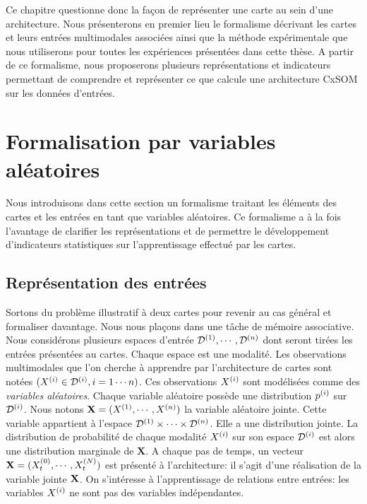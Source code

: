 Ce chapitre questionne donc la façon de représenter une carte au sein d'une architecture. Nous présenterons en premier lieu le formalisme décrivant les cartes et leurs entrées multimodales associées ainsi que la méthode expérimentale que nous utiliserons pour toutes les expériences présentées dans cette thèse. A partir de ce formalisme, nous proposerons plusieurs représentations et indicateurs permettant de comprendre et représenter ce que calcule une architecture CxSOM sur les données d'entrées.

\section{Formalisation par variables aléatoires}

Nous introduisons dans cette section un formalisme traitant les éléments des cartes et les entrées en tant que variables aléatoires. 
Ce formalisme a à la fois l'avantage de clarifier les représentations et de permettre le développement d'indicateurs statistiques sur l'apprentissage effectué par les cartes.

\subsection{Représentation des entrées}
Sortons du problème illustratif à deux cartes pour revenir au cas général et formaliser davantage.
Nous nous plaçons dans une tâche de mémoire associative. 
Nous considérons plusieurs espaces d'entrée $\mathcal{D}^{({1})},\cdots,\mathcal{D}^{({n})}$ dont seront tirées les entrées présentées au cartes. Chaque espace est une modalité.
Les observations multimodales que l'on cherche à apprendre par l'architecture de cartes sont notées $(X^{({i})} \in \mathcal{D}^{({i})}, i = 1 \cdots n)$. Ces observations $X^{({i})}$ sont modélisées comme des \emph{variables aléatoires}. Chaque variable aléatoire possède une distribution $p^{({i})}$ sur $\mathcal{D}^{({i})}$.
Nous notons $\mathbf{X} = (X^{({1})}, \cdots, X^{({n})})$ la variable aléatoire jointe. Cette variable appartient à l'espace $\mathcal{D}^{({1})} \times \cdots \times \mathcal{D}^{({n})}$. Elle a une distribution jointe. La distribution de probabilité de chaque modalité $X^{({i})}$ sur son espace $\mathcal{D}^{({i})}$ est alors une distribution marginale de $\mathbf{X}$.
A chaque pas de temps, un vecteur $\mathbf{X} = (X^{({0})}_t, \cdots , X^{({N})}_t)$ est présenté à l'architecture: il s'agit d'une réalisation de la variable jointe $\mathbf{X}$. On s'intéresse à l'apprentissage de relations entre entrées: les variables $X^{({i})}$ ne sont pas des variables indépendantes.

